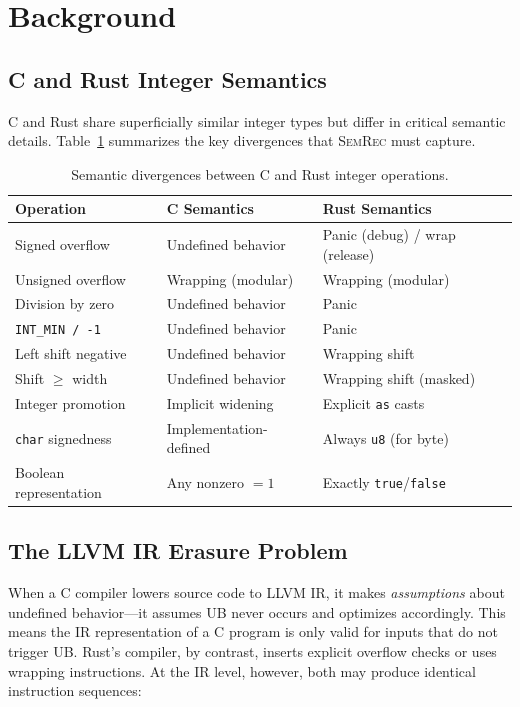 \documentclass[10pt,letterpaper]{article}
\begin{document}
\section{Background}
\label{sec:background}

\subsection{C and Rust Integer Semantics}

C and Rust share superficially similar integer types but differ in critical semantic
details. Table~\ref{tab:semantics} summarizes the key divergences that \textsc{SemRec}
must capture.

\begin{table}[t]
\centering
\caption{Semantic divergences between C and Rust integer operations.}
\label{tab:semantics}
\small
\begin{tabular}{@{}lll@{}}
\toprule
\textbf{Operation} & \textbf{C Semantics} & \textbf{Rust Semantics} \\
\midrule
Signed overflow & Undefined behavior & Panic (debug) / wrap (release) \\
Unsigned overflow & Wrapping (modular) & Wrapping (modular) \\
Division by zero & Undefined behavior & Panic \\
\texttt{INT\_MIN / -1} & Undefined behavior & Panic \\
Left shift negative & Undefined behavior & Wrapping shift \\
Shift $\geq$ width & Undefined behavior & Wrapping shift (masked) \\
Integer promotion & Implicit widening & Explicit \texttt{as} casts \\
\texttt{char} signedness & Implementation-defined & Always \texttt{u8} (for byte) \\
Boolean representation & Any nonzero $= 1$ & Exactly \texttt{true}/\texttt{false} \\
\bottomrule
\end{tabular}
\end{table}

\subsection{The LLVM IR Erasure Problem}
\label{sec:erasure}

When a C compiler lowers source code to LLVM IR, it makes \emph{assumptions} about
undefined behavior---it assumes UB never occurs and optimizes accordingly. This means
the IR representation of a C program is only valid for inputs that do not trigger UB.
Rust's compiler, by contrast, inserts explicit overflow checks or uses wrapping
instructions. At the IR level, however, both may produce identical instruction
sequences:
\end{document}

